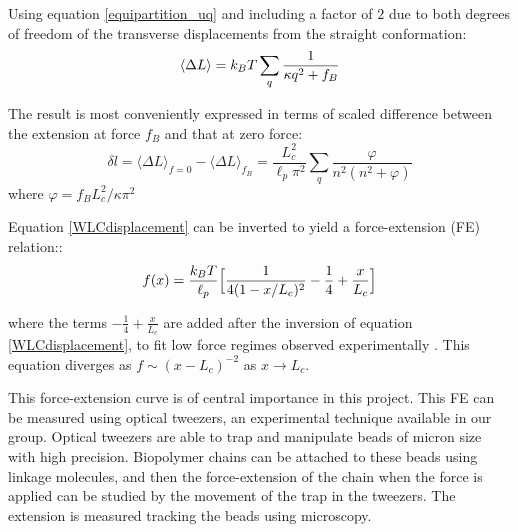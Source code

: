 Using equation \ref{equipartition_uq} and including a factor of $2$ due to both
degrees of freedom of the transverse displacements from the straight
conformation:
\begin{equation}\label{deltaLmean}
\langle\Delta L\rangle = k_B{}T\sum_q \frac{1}{\kappa{}q^2+f_B}
\end{equation}

The result is most conveniently expressed in terms of scaled difference between
the extension at force $f_B$ and that at zero force\citep{storm_nonlinear_2005}:
\begin{equation}\label{WLCdisplacement}
\delta l=\langle\Delta L\rangle_{f=0} - \langle\Delta L\rangle_{f_B} =
\frac{L_c^2}{\ell_p\pi^2} \sum_q \frac{\varphi}{n^2(n^2 + \varphi)}
\end{equation} 
where $\varphi = f_BL_c^2/\kappa{}\pi^2$

Equation \ref{WLCdisplacement} can be inverted to yield a force-extension (FE)
relation:\citep{marko_stretching_1995}:
\begin{equation}\label{FEMarko}
f(x)=\frac{k_B{}T}{\ell_p} \Big[ \frac{1}{4(1 - x/L_c)^2} 
-\frac{1}{4}+\frac{x}{L_c} \Big]
\end{equation}

where the terms $-\frac{1}{4}+\frac{x}{L_c}$ are added after the inversion of
equation \ref{WLCdisplacement}, to fit low force regimes observed
experimentally \citep{marko_stretching_1995}.
This equation diverges as $f \sim (x - L_c)^{-2}$ as $x\rightarrow L_c$.

This force-extension curve is of central importance in this project. This FE can
be measured using optical tweezers, an experimental technique available in our
group. Optical tweezers are able to trap and manipulate beads of
micron size with high
precision\citep{svoboda_direct_1993,svoboda_biological_1994}.
Biopolymer chains can be attached to these beads using linkage molecules, and then the force-extension of the
chain when the force is applied can be studied by the movement of the trap in
the tweezers.
The extension is measured tracking the beads using microscopy.

